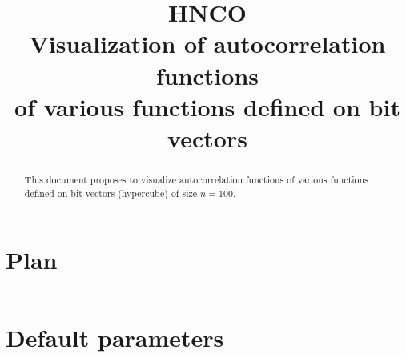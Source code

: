 \documentclass[a4paper]{article}
\begin{document}

\title{HNCO\\
  Visualization of autocorrelation functions\\
  of various functions defined on bit vectors}
\maketitle

\begin{abstract}
  This document proposes to visualize autocorrelation functions of
  various functions defined on bit vectors (hypercube) of size
  $n=100$.
\end{abstract}

\tableofcontents



\appendix

\section{Plan}

\inputminted[breaklines=true]{json}{../plan-compact.json}

\section{Default parameters}

\inputminted[breaklines=true]{text}{../log.defaults}
\end{document}
